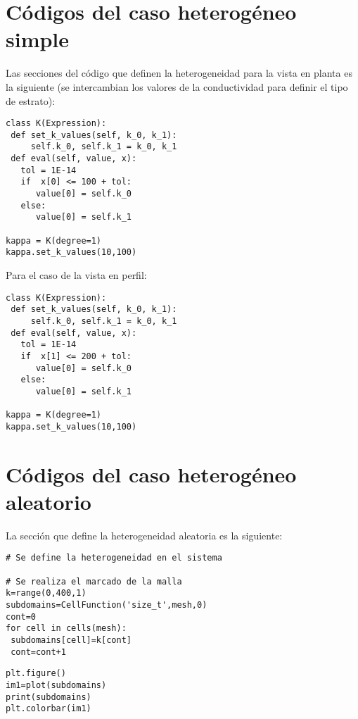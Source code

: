 \newpage


\section{Códigos del caso heterogéneo simple}

Las secciones del código que definen la heterogeneidad para la vista en planta es la siguiente (se intercambian los valores de la conductividad para definir el tipo de estrato):

\lstset{language=python}
\begin{lstlisting}[frame=single]
class K(Expression):
 def set_k_values(self, k_0, k_1):
     self.k_0, self.k_1 = k_0, k_1
 def eval(self, value, x):
   tol = 1E-14 
   if  x[0] <= 100 + tol:
      value[0] = self.k_0
   else:
      value[0] = self.k_1

kappa = K(degree=1)
kappa.set_k_values(10,100)

\end{lstlisting}

Para el caso de la vista en perfil:

\lstset{language=python,breaklines=true, basicstyle=\footnotesize}
\begin{lstlisting}[frame=single]
class K(Expression):
 def set_k_values(self, k_0, k_1):
     self.k_0, self.k_1 = k_0, k_1
 def eval(self, value, x):
   tol = 1E-14 
   if  x[1] <= 200 + tol:
      value[0] = self.k_0
   else:
      value[0] = self.k_1

kappa = K(degree=1)
kappa.set_k_values(10,100)

\end{lstlisting}

\section{Códigos del caso heterogéneo aleatorio}

La sección que define la heterogeneidad aleatoria es la siguiente:

\begin{lstlisting}[frame=single]
# Se define la heterogeneidad en el sistema

# Se realiza el marcado de la malla
k=range(0,400,1)
subdomains=CellFunction('size_t',mesh,0)
cont=0
for cell in cells(mesh):
 subdomains[cell]=k[cont]
 cont=cont+1
\end{lstlisting}

\begin{lstlisting}[frame=single]
plt.figure()
im1=plot(subdomains)
print(subdomains)
plt.colorbar(im1)
\end{lstlisting}


